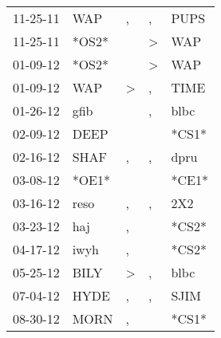 \begin{supertabular}{p{0.07\textwidth}p{0.06\textwidth}p{0.02\textwidth}p{0.02\textwidth}p{0.06\textwidth}}
          11-25-11\textsuperscript{} &            WAP\textsuperscript{} &                , &                , &           PUPS\textsuperscript{} \\
          11-25-11\textsuperscript{} &                            *OS2* &                  &     \textgreater &            WAP\textsuperscript{} \\
          01-09-12\textsuperscript{} &                            *OS2* &                  &     \textgreater &            WAP\textsuperscript{} \\
          01-09-12\textsuperscript{} &            WAP\textsuperscript{} &     \textgreater &                , &           TIME\textsuperscript{} \\
          01-26-12\textsuperscript{} &           gfib\textsuperscript{} &                  &                , &           blbc\textsuperscript{} \\
          02-09-12\textsuperscript{} &           DEEP\textsuperscript{} &                  &                  &                            *CS1* \\
          02-16-12\textsuperscript{} &           SHAF\textsuperscript{} &                , &                , &           dpru\textsuperscript{} \\
          03-08-12\textsuperscript{} &                            *OE1* &                  &                  &                            *CE1* \\
          03-16-12\textsuperscript{} &           reso\textsuperscript{} &                , &                , &            2X2\textsuperscript{} \\
          03-23-12\textsuperscript{} &            haj\textsuperscript{} &                , &                  &                            *CS2* \\
          04-17-12\textsuperscript{} &           iwyh\textsuperscript{} &                , &                  &                            *CS2* \\
          05-25-12\textsuperscript{} &           BILY\textsuperscript{} &     \textgreater &                , &           blbc\textsuperscript{} \\
          07-04-12\textsuperscript{} &           HYDE\textsuperscript{} &                , &                , &           SJIM\textsuperscript{} \\
          08-30-12\textsuperscript{} &           MORN\textsuperscript{} &                , &                  &                            *CS1* \\

\end{supertabular}
